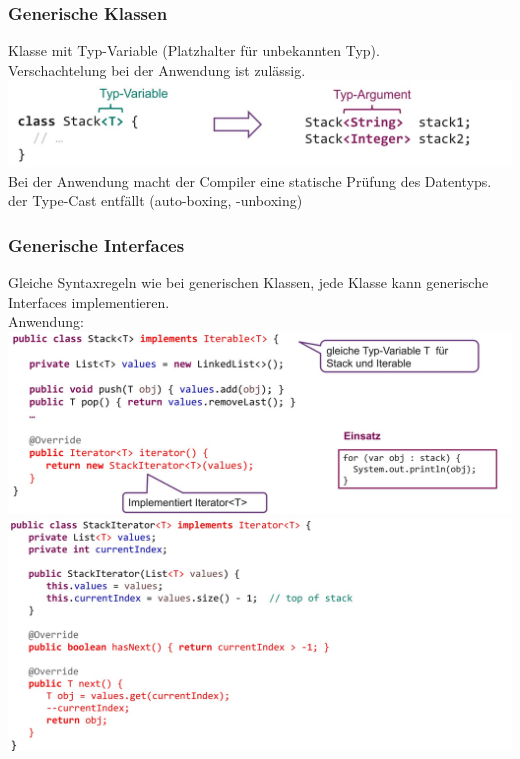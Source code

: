 {    \subsubsection{Generische Klassen}
        Klasse mit Typ-Variable (Platzhalter für unbekannten Typ).\\
        Verschachtelung bei der Anwendung ist zulässig.\\
        \vspace{-0.1cm}
        \includegraphics[width=0.8\linewidth]{pictures/generic-class.jpg}\\
        Bei der Anwendung macht der Compiler eine statische Prüfung des Datentyps. der Type-Cast entfällt (auto-boxing, -unboxing)
        \vspace{-0.1cm}


    \subsubsection{Generische Interfaces}\label{StackIterator}
        Gleiche Syntaxregeln wie bei generischen Klassen, jede Klasse kann generische Interfaces implementieren.\\
        Anwendung:\\
        \includegraphics[width=0.8\linewidth]{pictures/generic-interface1.jpg}
        \includegraphics[width=0.8\linewidth]{pictures/generic-interface2.jpg}
        \vspace{-0.1cm}

}
